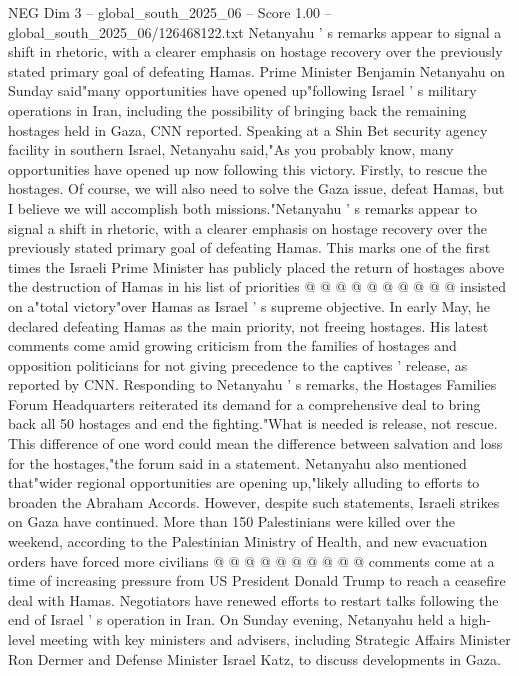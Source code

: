 \begin{textsample}{NEG Dim 3 – global\_south\_2025\_06 – Score 1.00 – global\_south\_2025\_06/126468122.txt}  \label{ex:f3_neg_253}
Netanyahu ' s remarks appear to signal a shift in rhetoric, with a clearer emphasis on hostage recovery over the previously stated primary goal of defeating Hamas.
Prime Minister Benjamin Netanyahu on Sunday said"many opportunities have opened up"following Israel ' s military operations in Iran, including the possibility of bringing back the remaining hostages held in Gaza, CNN reported.
Speaking at a Shin Bet security agency facility in southern Israel, Netanyahu said,"As you probably know, many opportunities have opened up now following this victory.
Firstly, to rescue the hostages.
Of course, we will also need to solve the Gaza issue, defeat Hamas, but I believe we will accomplish both missions."Netanyahu ' s remarks appear to signal a shift in rhetoric, with a clearer emphasis on hostage recovery over the previously stated primary goal of defeating Hamas.
This marks one of the first times the Israeli Prime Minister has publicly placed the return of hostages above the destruction of Hamas in his list of priorities @ @ @ @ @ @ @ @ @ @ insisted on a"total victory"over Hamas as Israel ' s supreme objective.
In early May, he declared defeating Hamas as the main priority, not freeing hostages.
His latest comments come amid growing criticism from the families of hostages and opposition politicians for not giving precedence to the captives ' release, as reported by CNN.
Responding to Netanyahu ' s remarks, the Hostages Families Forum Headquarters reiterated its demand for a comprehensive deal to bring back all 50 hostages and end the fighting."What is needed is release, not rescue.
This difference of one word could mean the difference between salvation and loss for the hostages,"the forum said in a statement.
Netanyahu also mentioned that"wider regional opportunities are opening up,"likely alluding to efforts to broaden the Abraham Accords.
However, despite such statements, Israeli strikes on Gaza have continued.
More than 150 Palestinians were killed over the weekend, according to the Palestinian Ministry of Health, and new evacuation orders have forced more civilians @ @ @ @ @ @ @ @ @ @ comments come at a time of increasing pressure from US President Donald Trump to reach a ceasefire deal with Hamas.
Negotiators have renewed efforts to restart talks following the end of Israel ' s operation in Iran.
On Sunday evening, Netanyahu held a high-level meeting with key ministers and advisers, including Strategic Affairs Minister Ron Dermer and Defense Minister Israel Katz, to discuss developments in Gaza.

\end{textsample}
